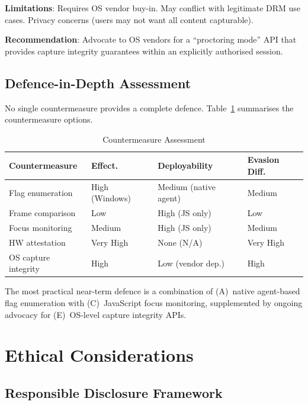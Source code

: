 \documentclass[conference]{IEEEtran}
\begin{document}
\textbf{Limitations}: Requires OS vendor buy-in. May conflict with legitimate DRM use cases. Privacy concerns (users may not want all content capturable).

\textbf{Recommendation}: Advocate to OS vendors for a ``proctoring mode'' API that provides capture integrity guarantees within an explicitly authorised session.

\subsection{Defence-in-Depth Assessment}

No single countermeasure provides a complete defence. Table~\ref{tab:countermeasures} summarises the countermeasure options.

\begin{table}[t]
\centering
\caption{Countermeasure Assessment}
\label{tab:countermeasures}
\begin{tabularx}{\columnwidth}{Xp{1.3cm}p{1.7cm}p{1.5cm}}
\toprule
\textbf{Countermeasure} & \textbf{Effect.} & \textbf{Deployability} & \textbf{Evasion Diff.} \\
\midrule
Flag enumeration & High (Windows) & Medium (native agent) & Medium \\
Frame comparison & Low & High (JS only) & Low \\
Focus monitoring & Medium & High (JS only) & Medium \\
HW attestation & Very High & None (N/A) & Very High \\
OS capture integrity & High & Low (vendor dep.) & High \\
\bottomrule
\end{tabularx}
\end{table}

The most practical near-term defence is a combination of (A)~native agent-based flag enumeration with (C)~JavaScript focus monitoring, supplemented by ongoing advocacy for (E)~OS-level capture integrity APIs.

\section{Ethical Considerations}

\subsection{Responsible Disclosure Framework}
\end{document}
